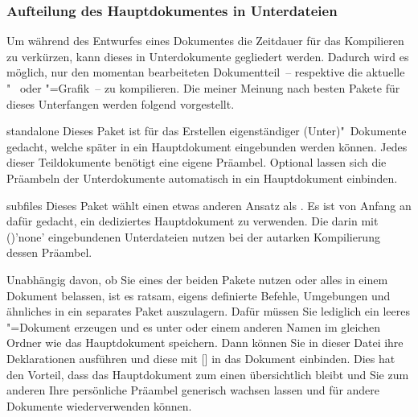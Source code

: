\subsubsection{Aufteilung des Hauptdokumentes in Unterdateien}
Um während des Entwurfes eines Dokumentes die Zeitdauer für das Kompilieren zu 
verkürzen, kann dieses in Unterdokumente gegliedert werden. Dadurch wird es 
möglich, nur den momentan bearbeiteten Dokumentteil~-- respektive die aktuelle 
"~ oder "=Grafik~-- zu kompilieren. Die meiner 
Meinung nach besten Pakete für dieses Unterfangen werden folgend vorgestellt.
%
\begin{packages}
\item[standalone]
  Dieses Paket ist für das Erstellen eigenständiger (Unter)"~Dokumente gedacht, 
  welche später in ein Hauptdokument eingebunden werden können. Jedes dieser 
  Teildokumente benötigt eine eigene Präambel. Optional lassen sich die 
  Präambeln der Unterdokumente automatisch in ein Hauptdokument einbinden.
\item[subfiles]
  Dieses Paket wählt einen etwas anderen Ansatz als . Es 
  ist von Anfang an dafür gedacht, ein dediziertes Hauptdokument zu verwenden. 
  Die darin mit ()'none' eingebundenen 
  Unterdateien nutzen bei der autarken Kompilierung dessen Präambel.
\end{packages}
%
Unabhängig davon, ob Sie eines der beiden Pakete nutzen oder alles in einem 
Dokument belassen, ist es ratsam, eigens definierte Befehle, Umgebungen und 
ähnliches in ein separates Paket auszulagern. Dafür müssen Sie lediglich ein 
leeres "=Dokument erzeugen und es unter  
oder einem anderen Namen im gleichen Ordner wie das Hauptdokument speichern. 
Dann können Sie in dieser Datei ihre Deklarationen ausführen und diese mit 
[] in das Dokument einbinden. Dies 
hat den Vorteil, dass das Hauptdokument zum einen übersichtlich bleibt und Sie 
zum anderen Ihre persönliche Präambel generisch wachsen lassen und für andere 
Dokumente wiederverwenden können.

